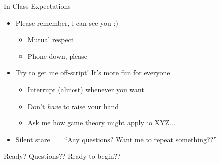 \begin{frame}{In-Class Expectations}

\begin{itemize}
    \item Please remember, I can see you :)
    \begin{itemize}
        \item Mutual respect
        \item Phone down, please
    \end{itemize}
    \item Try to get me off-script! It's more fun for everyone
    \begin{itemize}
        \item Interrupt (almost) whenever you want
        \item Don't \textit{have} to raise your hand
        \item Ask me how game theory might apply to XYZ...
    \end{itemize}
    \item Silent stare $=$ ``Any questions? Want me to repeat something??''
\end{itemize}
\end{frame}

\begin{frame}{Ready?}
    \centering
    \vfill
    \Large{Questions?? Ready to begin??}
    \vfill
\end{frame}


